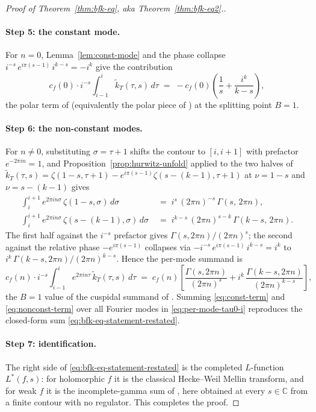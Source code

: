 \documentclass[11pt]{article}
\numberwithin{equation}{section}  %
\newcommand{\CC}{\mathbb{C}}
\begin{document}
\begin{proof}[Proof of Theorem~\ref{thm:bfk-eq}, aka Theorem~\ref{thm:bfk-eq2}.]
\paragraph{Step 5: the constant mode.}
For $n = 0$, Lemma~\ref{lem:const-mode} and the phase collapse
$i^{-s}\,e^{i\pi(s-1)}\,i^{k-s} = -i^k$ give the contribution
\begin{equation}\label{eq:const-term}
  c_f(0)\cdot i^{-s}\!\int_{i - 1}^{i}\!\widetilde{k}_T(\tau, s)\,d\tau
  \;=\; -c_f(0)\!\left(\frac{1}{s} + \frac{i^k}{k - s}\right),
\end{equation}
the polar term of \cite[Lemma~2.1]{1806} (equivalently the polar piece
of \cite[Thm.~1.1]{BFK2011}) at the splitting point $B = 1$.

\paragraph{Step 6: the non-constant modes.}
For $n \ne 0$, substituting $\sigma = \tau + 1$ shifts the contour to
$[i, i + 1]$ with prefactor $e^{-2\pi i n} = 1$, and
Proposition~\ref{prop:hurwitz-unfold} applied to the two halves of
$\widetilde{k}_T(\tau, s) = \zeta(1 - s, \tau + 1) - e^{i\pi(s-1)}\zeta(s - (k-1), \tau + 1)$
at $\nu = 1 - s$ and $\nu = s - (k - 1)$ gives
\begin{align}
  \int_i^{i+1}\! e^{2\pi i n \sigma}\,\zeta(1 - s, \sigma)\,d\sigma
  \;&=\; i^s\,(2\pi n)^{-s}\,\Gamma(s,\, 2\pi n),
  \label{eq:unfold-half1}\\
  \int_i^{i+1}\! e^{2\pi i n \sigma}\,\zeta(s - (k - 1), \sigma)\,d\sigma
  \;&=\; i^{k - s}\,(2\pi n)^{s - k}\,\Gamma(k - s,\, 2\pi n).
  \label{eq:unfold-half2}
\end{align}
The first half against the $i^{-s}$ prefactor gives
$\Gamma(s, 2\pi n)/(2\pi n)^s$; the second against the relative phase
$-e^{i\pi(s-1)}$ collapses via $-i^{-s}\,e^{i\pi(s-1)}\,i^{k-s} = i^k$
to $i^k\,\Gamma(k - s, 2\pi n)/(2\pi n)^{k - s}$.  Hence the per-mode
summand is
\begin{equation}\label{eq:nonconst-term}
  c_f(n)\cdot i^{-s}\!\int_{i - 1}^{i}\! e^{2\pi i n \tau}\,
  \widetilde{k}_T(\tau, s)\,d\tau
  \;=\; c_f(n)\!\left[\frac{\Gamma(s, 2\pi n)}{(2\pi n)^s}
  + i^k\,\frac{\Gamma(k - s, 2\pi n)}{(2\pi n)^{k - s}}\right],
\end{equation}
the $B = 1$ value of the cuspidal summand of \cite[Lemma~2.1]{1806}.
Summing \eqref{eq:const-term} and \eqref{eq:nonconst-term} over all
Fourier modes in \eqref{eq:per-mode-tau0-i} reproduces the closed-form
sum \eqref{eq:bfk-eq-statement-restated}.

\paragraph{Step 7: identification.}
The right side of \eqref{eq:bfk-eq-statement-restated} is the completed
$L$-function $L^*(f, s)$: for holomorphic $f$ it is the classical
Hecke--Weil Mellin transform, and for weak $f$ it is the
incomplete-gamma sum of \cite{BFK2011}, here obtained at every
$s \in \CC$ from a finite contour with no regulator.  This completes
the proof.
\end{proof}
\end{document}
